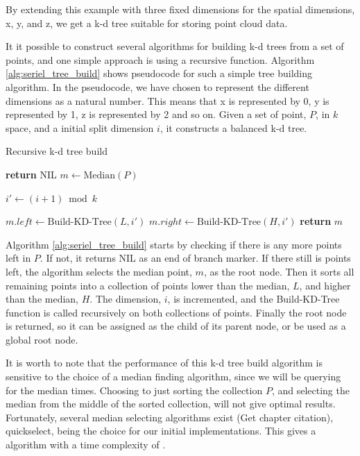 By extending this example with three fixed dimensions for the spatial dimensions, x, y, and z, we get a k-d tree suitable for storing point cloud data.

It it possible to construct several algorithms for building k-d trees from a set of points, and one simple approach is using a recursive function. Algorithm \ref{alg:seriel_tree_build} shows pseudocode for such a simple tree building algorithm. In the pseudocode, we have chosen to represent the different dimensions as a natural number. This means that x is represented by 0, y is represented by 1, z is represented by 2 and so on. Given a set of point, $P$, in $k$ space, and a initial split dimension $i$, it constructs a balanced k-d tree.

\begin{algorithm}
\caption{Recursive k-d tree build}
\label{alg:seriel_tree_build}
\begin{algorithmic}
         
            \State \textbf{return} NIL
        \Else
            \State $m \gets \text{Median}(P)$

            \State {}
            \State {}

            \State $i' \gets (i + 1) \bmod k$ 

            \State $m.left \gets \text{Build-KD-Tree}(L, i')$
            \State $m.right \gets \text{Build-KD-Tree}(H, i')$
        \EndIf
        \State \textbf{return} $m$
    \EndFunction
\end{algorithmic}
\end{algorithm}

Algorithm \ref{alg:seriel_tree_build} starts by checking if there is any more points left in $P$. If not, it returns NIL as an end of branch marker. If there still is points left, the algorithm selects the median point, $m$, as the root node. Then it sorts all remaining points into a collection of points lower than the median, $L$, and higher than the median, $H$. The dimension, $i$, is incremented, and the Build-KD-Tree function is called recursively on both collections of points. Finally the root node is returned, so it can be assigned as the child of its parent node, or be used as a global root node.

It is worth to note that the performance of this k-d tree build algorithm is sensitive to the choice of a median finding algorithm, since we will be querying for the median  times. Choosing to just sorting the collection $P$, and selecting the median from the middle of the sorted collection, will not give optimal results. Fortunately, several  median selecting algorithms exist \cite{Cormen:2001} (Get chapter citation), quickselect, being the choice for our initial implementations. This gives a algorithm with a time complexity of  \cite{Friedman:1977}.

